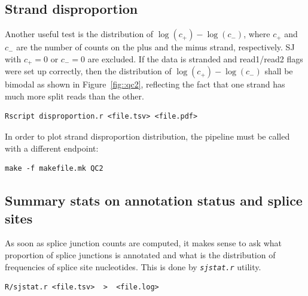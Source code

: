 \documentclass{article}
\newcommand{\prog}[1]{{\tt\em #1}}
\begin{document}
\subsection{Strand disproportion}
Another useful test is the distribution of $\log(c_+) - \log(c_-)$, where $c_+$ and $c_-$ are the number of counts on the plus and the minus strand,
respectively. SJ with $c_+=0$ or $c_-=0$ are excluded. If the data is stranded and read1/read2 flags were set up correctly, then the distribution of
$\log(c_+) - \log(c_-)$ shall be bimodal as shown in Figure~\ref{fig::qc2}, reflecting the fact that one strand has much more split reads than
the other.
\begin{verbatim}
Rscript disproportion.r <file.tsv> <file.pdf>
\end{verbatim}
In order to plot  strand disproportion distribution, the pipeline must be called with a different endpoint:
\begin{verbatim}
make -f makefile.mk QC2
\end{verbatim}

\subsection{Summary stats on annotation status and splice sites}
As soon as splice junction counts are computed, it makes sense to ask what proportion of splice junctions is annotated and what is the distribution of
frequencies of splice site nucleotides. This is done by \prog{sjstat.r} utility.
\begin{verbatim}
R/sjstat.r <file.tsv>  >  <file.log>
\end{verbatim}



\end{document}

